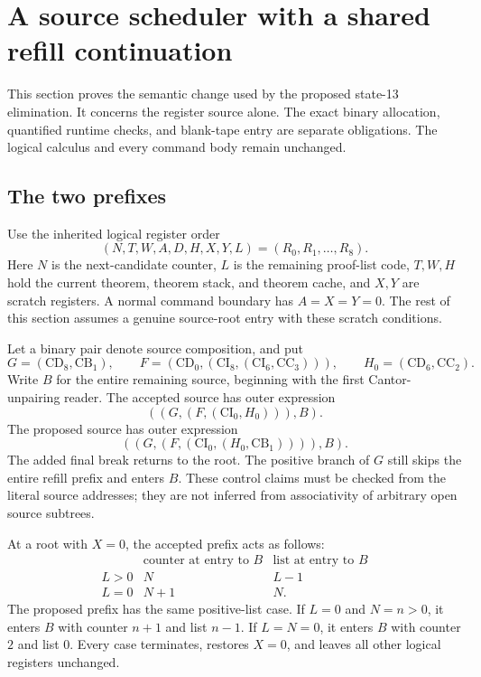 \section{A source scheduler with a shared refill continuation}
\label{sec:refill-scheduler}

This section proves the semantic change used by the proposed state-13
elimination. It concerns the register source alone. The exact binary
allocation, quantified runtime checks, and blank-tape entry are separate
obligations. The logical calculus and every command body remain unchanged.

\subsection{The two prefixes}

Use the inherited logical register order
\[
 (N,T,W,A,D,H,X,Y,L)=(R_0,R_1,\ldots,R_8).
\]
Here $N$ is the next-candidate counter, $L$ is the remaining proof-list
code, $T,W,H$ hold the current theorem, theorem stack, and theorem cache,
and $X,Y$ are scratch registers. A normal command boundary has
$A=X=Y=0$. The rest of this section assumes a genuine source-root entry
with these scratch conditions.

Let a binary pair denote source composition, and put
\[
 G=(\mathrm{CD}_8,\mathrm{CB}_1),\qquad
 F=(\mathrm{CD}_0,(\mathrm{CI}_8,(\mathrm{CI}_6,\mathrm{CC}_3))),
 \qquad H_0=(\mathrm{CD}_6,\mathrm{CC}_2).
\]
Write $B$ for the entire remaining source, beginning with the first
Cantor-unpairing reader. The accepted source has outer expression
\begin{equation}
 ((G,(F,(\mathrm{CI}_0,H_0))),B).
 \label{eq:old-refill-source}
\end{equation}
The proposed source has outer expression
\begin{equation}
 ((G,(F,(\mathrm{CI}_0,(H_0,\mathrm{CB}_1)))),B).
 \label{eq:new-refill-source}
\end{equation}
The added final break returns to the root. The positive branch of $G$
still skips the entire refill prefix and enters $B$. These control claims
must be checked from the literal source addresses; they are not inferred
from associativity of arbitrary open source subtrees.

\begin{lemma}
\label{lem:refill-effect}
At a root with $X=0$, the accepted prefix acts as follows:
\[
 \begin{array}{c|c|c}
 &\text{counter at entry to }B&\text{list at entry to }B\\\hline
 L>0&N&L-1\\
 L=0&N+1&N.
 \end{array}
\]
The proposed prefix has the same positive-list case. If $L=0$ and
$N=n>0$, it enters $B$ with counter $n+1$ and list $n-1$.
If $L=N=0$, it enters $B$ with counter $2$ and list $0$.
Every case terminates, restores $X=0$, and leaves all other logical
registers unchanged.
\end{lemma}

